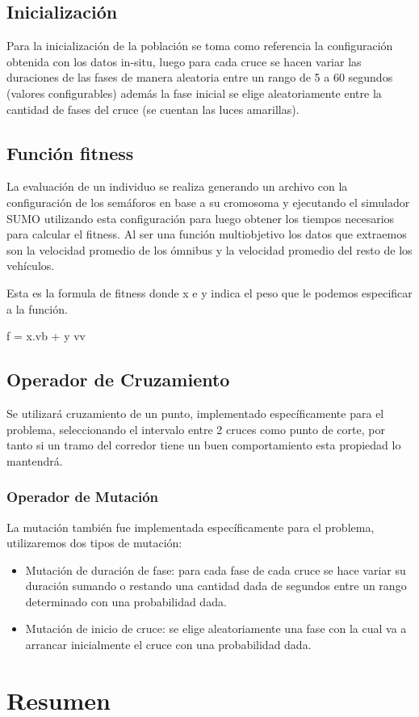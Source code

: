 \subsection{Inicialización}

Para la inicialización de la población se toma como referencia
la configuración obtenida con los datos in-situ, luego para cada
cruce se hacen variar las duraciones de las fases de manera aleatoria entre un rango de  5 a 60  segundos  (valores configurables)
además la fase inicial se elige aleatoriamente entre la cantidad de fases del cruce (se cuentan las luces amarillas).

\subsection{Función fitness}
La evaluación de un individuo se realiza generando un archivo con la configuración de los semáforos en base a su cromosoma y ejecutando el simulador SUMO utilizando esta configuración para luego obtener los tiempos necesarios para calcular el fitness.
Al ser una función multiobjetivo los datos que extraemos son la velocidad promedio de los ómnibus y la velocidad promedio del resto de los vehículos.

Esta es la formula de fitness donde x e y indica el peso que le podemos especificar a la función.

f = x.vb + y vv


\subsection{Operador de Cruzamiento}
Se  utilizará cruzamiento  de  un  punto,  implementado
específicamente  para  el  problema,  seleccionando  el  intervalo
entre 2 cruces como punto de corte, por tanto si un tramo del corredor tiene un buen comportamiento esta propiedad lo mantendrá.


\subsubsection{Operador de Mutación}
La  mutación también fue  implementada  específicamente para
el problema, utilizaremos dos tipos de mutación:
\begin{itemize}

\item Mutación de duración de fase: para cada fase de cada cruce se
hace variar su duración sumando o restando una cantidad dada
de segundos entre un rango determinado con una probabilidad
dada.
\item Mutación de inicio de cruce: se elige aleatoriamente una fase
con  la  cual  va  a  arrancar  inicialmente  el  cruce  con  una
probabilidad dada.

\end{itemize}

\section{Resumen}